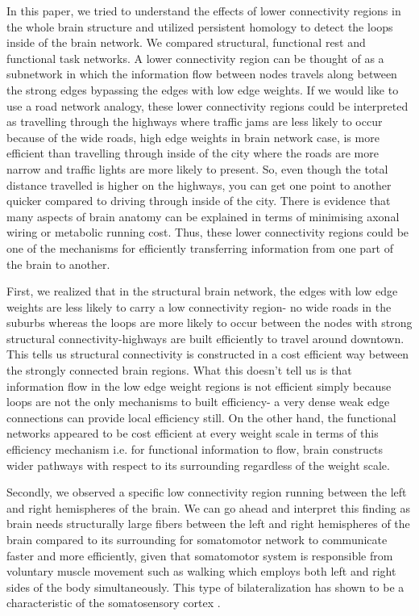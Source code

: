 \documentclass[9pt,twocolumn,twoside,lineno]{pnas-new}
\begin{document}
In this paper, we tried to understand the effects of lower connectivity regions in the whole brain structure and utilized persistent homology to detect the loops inside of the brain network. We compared structural, functional rest and functional task networks. A lower connectivity region can be thought of as a subnetwork in which the information flow between nodes travels along between the strong edges bypassing the edges with low edge weights. If we would like to use a road network analogy, these lower connectivity regions could be interpreted as travelling through the highways where traffic jams are less likely to occur because of the wide roads, high edge weights in brain network case, is more efficient than travelling through inside of the city where the roads are more narrow and traffic lights are more likely to present. So, even though the total distance travelled is higher on the highways, you can get one point to another quicker compared to driving through inside of the city. There is evidence that many aspects of brain anatomy can be explained in terms of minimising axonal wiring or metabolic running cost\cite{wiringoptim}. Thus, these lower connectivity regions could be one of the mechanisms for efficiently transferring information from one part of the brain to another.

First, we realized that in the structural brain network, the edges with low edge weights are less likely to carry a low connectivity region- no wide roads in the suburbs whereas the loops are more likely to occur between the nodes with strong structural connectivity-highways are built efficiently to travel around downtown. This tells us structural connectivity is constructed in a cost efficient way between the strongly connected brain regions. What this doesn't tell us is that information flow in the low edge weight regions is not efficient simply because loops are not the only mechanisms to built efficiency- a very dense weak edge connections can provide local efficiency still. On the other hand, the functional networks appeared to be cost efficient at every weight scale in terms of this efficiency mechanism i.e. for functional information to flow, brain constructs wider pathways with respect to its surrounding regardless of the weight scale.

Secondly, we observed a specific low connectivity region running between the left and right hemispheres of the brain. We can go ahead and interpret this finding as brain needs structurally large fibers between the left and right hemispheres of the brain compared to its surrounding for somatomotor network to communicate faster and more efficiently, given that somatomotor system is responsible from voluntary muscle movement such as walking which employs both left and right sides of the body simultaneously. This type of bilateralization has shown to be a characteristic of the somatosensory cortex \cite{bilateral}.
\end{document}
